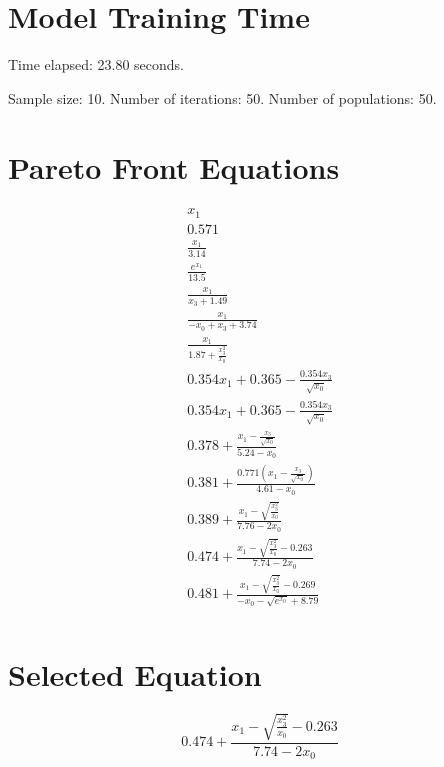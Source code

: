 \documentclass{article}
\begin{document}
\section*{Model Training Time}
Time elapsed: 23.80 seconds.

Sample size: 10.
Number of iterations: 50.
Number of populations: 50.

\section*{Pareto Front Equations}
\begin{align*}
x_{1} \\
0.571 \\
\frac{x_{1}}{3.14} \\
\frac{e^{x_{1}}}{13.5} \\
\frac{x_{1}}{x_{3} + 1.49} \\
\frac{x_{1}}{- x_{0} + x_{3} + 3.74} \\
\frac{x_{1}}{1.87 + \frac{x_{3}^{2}}{x_{0}}} \\
0.354 x_{1} + 0.365 - \frac{0.354 x_{3}}{\sqrt{x_{0}}} \\
0.354 x_{1} + 0.365 - \frac{0.354 x_{3}}{\sqrt{x_{0}}} \\
0.378 + \frac{x_{1} - \frac{x_{3}}{\sqrt{x_{0}}}}{5.24 - x_{0}} \\
0.381 + \frac{0.771 \left(x_{1} - \frac{x_{3}}{\sqrt{x_{0}}}\right)}{4.61 - x_{0}} \\
0.389 + \frac{x_{1} - \sqrt{\frac{x_{3}^{2}}{x_{0}}}}{7.76 - 2 x_{0}} \\
0.474 + \frac{x_{1} - \sqrt{\frac{x_{3}^{2}}{x_{0}}} - 0.263}{7.74 - 2 x_{0}} \\
0.481 + \frac{x_{1} - \sqrt{\frac{x_{3}^{2}}{x_{0}}} - 0.269}{- x_{0} - \sqrt{e^{x_{0}}} + 8.79} \\
\end{align*}

\section*{Selected Equation}
\[ 0.474 + \frac{x_{1} - \sqrt{\frac{x_{3}^{2}}{x_{0}}} - 0.263}{7.74 - 2 x_{0}} \]
\end{document}
